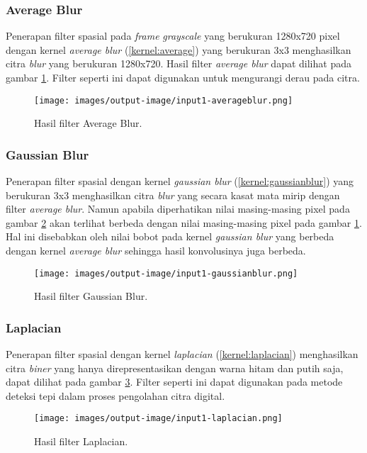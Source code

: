 
\subsubsection{Average Blur}
Penerapan filter spasial pada \textit{frame} \textit{grayscale} yang berukuran 1280x720 pixel dengan kernel \textit{average blur} (\ref{kernel:average}) yang berukuran 3x3 menghasilkan citra 
\textit{blur} yang berukuran 1280x720. Hasil filter \textit{average blur} dapat dilihat pada gambar \ref{fig:output-averageblur}. Filter seperti ini dapat digunakan untuk mengurangi derau pada citra.
\begin{figure}
    \texttt{[image: images/output-image/input1-averageblur.png]}
    \caption{Hasil filter Average Blur.}
    \label{fig:output-averageblur}
\end{figure}

\subsubsection{Gaussian Blur}
Penerapan filter spasial dengan kernel \textit{gaussian blur} (\ref{kernel:gaussianblur}) yang berukuran 3x3 menghasilkan citra \textit{blur} yang secara kasat mata mirip dengan filter \textit{average blur}. Namun apabila diperhatikan nilai masing-masing pixel pada gambar \ref{fig:output-gaussianblur} akan terlihat berbeda dengan nilai masing-masing pixel pada gambar \ref{fig:output-averageblur}. Hal ini disebabkan oleh nilai bobot pada kernel \textit{gaussian blur} yang berbeda dengan kernel \textit{average blur} sehingga hasil konvolusinya juga berbeda. 
\begin{figure}
    \texttt{[image: images/output-image/input1-gaussianblur.png]}
    \caption{Hasil filter Gaussian Blur.}
    \label{fig:output-gaussianblur}
\end{figure}

\subsubsection{Laplacian}
Penerapan filter spasial dengan kernel \textit{laplacian} (\ref{kernel:laplacian}) menghasilkan citra \textit{biner} yang hanya direpresentasikan dengan warna hitam dan putih saja, dapat dilihat pada gambar \ref{fig:output-laplacian}. Filter seperti ini dapat digunakan pada metode deteksi tepi dalam proses pengolahan citra digital.
\begin{figure}
    \texttt{[image: images/output-image/input1-laplacian.png]}
    \caption{Hasil filter Laplacian.}
    \label{fig:output-laplacian}
\end{figure}

